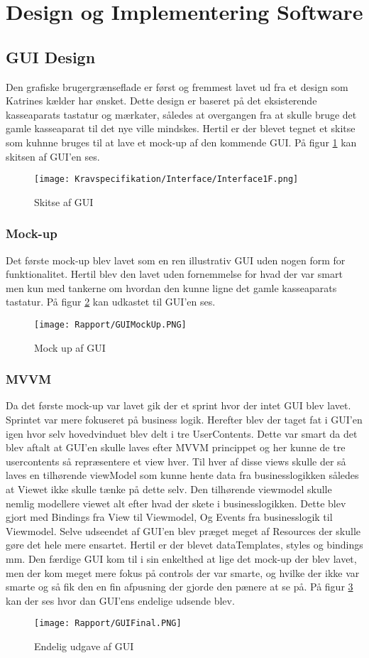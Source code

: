 \section{Design og Implementering Software}
\subsection{GUI Design}
Den grafiske brugergrænseflade er først og fremmest lavet ud fra et design som Katrines kælder
har ønsket. Dette design er baseret på det eksisterende kasseaparats tastatur og mærkater, således
at overgangen fra at skulle bruge det gamle kasseaparat til det nye ville mindskes.
Hertil er der blevet tegnet et skitse som kuhnne bruges til at lave et mock-up af den kommende GUI. På figur \ref{fig:GUTskitse} kan skitsen af GUI'en ses.\newline

\begin{figure}[H]
\centering
	\texttt{[image: Kravspecifikation/Interface/Interface1F.png]}
	\caption{Skitse af GUI}
	\label{fig:GUTskitse}
\end{figure}

\subsubsection{Mock-up}
Det første mock-up blev lavet som en ren illustrativ GUI uden nogen form for funktionalitet. Hertil
blev den lavet uden fornemmelse for hvad der var smart men kun med tankerne om hvordan den
kunne ligne det gamle kasseaparats tastatur. På figur \ref{fig:GUIMock} kan udkastet til GUI'en ses.
\begin{figure}[H]
\centering
	\texttt{[image: Rapport/GUIMockUp.PNG]}
	\caption{Mock up af GUI}
	\label{fig:GUIMock}
\end{figure}
\subsubsection{MVVM}
Da det første mock-up var lavet gik der et sprint hvor der intet GUI blev lavet. Sprintet var mere fokuseret på business logik. Herefter blev der taget fat i GUI’en igen hvor selv hovedvinduet blev delt i tre
UserContents. Dette var smart da det blev aftalt at GUI’en skulle laves efter MVVM princippet
og her kunne de tre usercontents så repræsentere et view hver. Til hver af disse views skulle der så
laves en tilhørende viewModel som kunne hente data fra businesslogikken således at Viewet ikke
skulle tænke på dette selv. Den tilhørende viewmodel skulle nemlig modellere viewet alt efter hvad
der skete i businesslogikken. Dette blev gjort med Bindings fra View til Viewmodel, Og Events fra
businesslogik til Viewmodel.
Selve udseendet af GUI’en blev præget meget af Resources der skulle gøre det hele mere ensartet.
Hertil er der blevet dataTemplates, styles og bindings mm.
Den færdige GUI kom til i sin enkelthed at lige det mock-up der blev lavet, men der kom meget
mere fokus på controls der var smarte, og hvilke der ikke var smarte og så fik den en fin
afpusning der gjorde den pænere at se på. På figur \ref{fig:GUIFinal} kan der ses hvor dan GUI'ens endelige udsende blev.

\begin{figure}[H]
\centering
	\texttt{[image: Rapport/GUIFinal.PNG]}
	\caption{Endelig udgave af GUI}
	\label{fig:GUIFinal}
\end{figure}